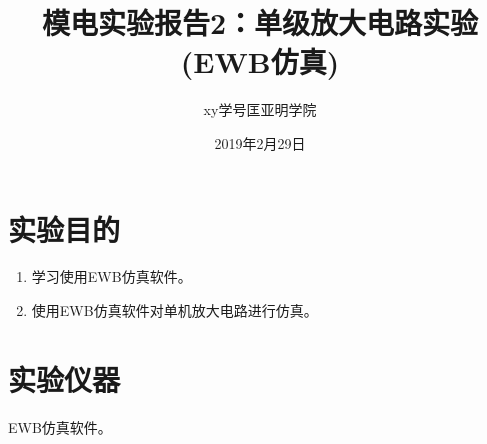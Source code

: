 \documentclass[a4paper]{article}
\title{模电实验报告2：单级放大电路实验(EWB仿真)}
\author{xy\quad 学号\quad 匡亚明学院}
\date{2019年2月29日}
\begin{document}
\maketitle


\section{实验目的}
\begin{enumerate}
\item 学习使用EWB仿真软件。
\item 使用EWB仿真软件对单机放大电路进行仿真。
\end{enumerate}

\section{实验仪器}
EWB仿真软件。
\end{document}
